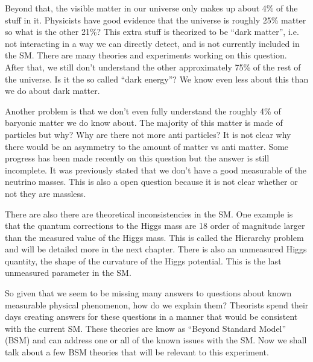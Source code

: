 Beyond that, the visible matter in our universe only makes up about 4\% of the stuff in it. Physicists have good evidence that the universe is roughly 25\% matter so what is the other 21\%?
This extra stuff is theorized to be ``dark matter'', i.e. not interacting in a way we can directly detect, and is not currently included in the SM. There are many theories and experiments working on this question.
After that, we still don't understand the other approximately 75\% of the rest of the universe. Is it the so called ``dark energy''? We know even less about this than we do about dark matter.

Another problem is that we don't even fully understand the roughly 4\% of baryonic matter we do know about. The majority of this matter is made of particles but why? Why are there not more anti particles? It is not clear why there would be an asymmetry to the amount of matter vs anti matter. 
Some progress has been made recently on this question but the answer is still incomplete. It was previously stated that we don't have a good measurable of the neutrino masses. This is also a open question because it is not clear whether or not they are massless.

There are also there are theoretical inconsistencies in the SM. One example is that the quantum corrections to the Higgs mass are 18 order of magnitude larger than the measured value of the Higgs mass. 
This is called the Hierarchy problem and will be detailed more in the next chapter. There is also an unmeasured Higgs quantity, the shape of the curvature of the Higgs potential.
This is the last unmeasured parameter in the SM.

So given that we seem to be missing many answers to questions about known measurable physical phenomenon, how do we explain them? Theorists spend their days creating answers for these questions in a manner that would be consistent with the current SM.
These theories are know as ``Beyond Standard Model'' (BSM) and can address one or all of the known issues with the SM. Now we shall talk about a few BSM theories that will be relevant to this experiment.